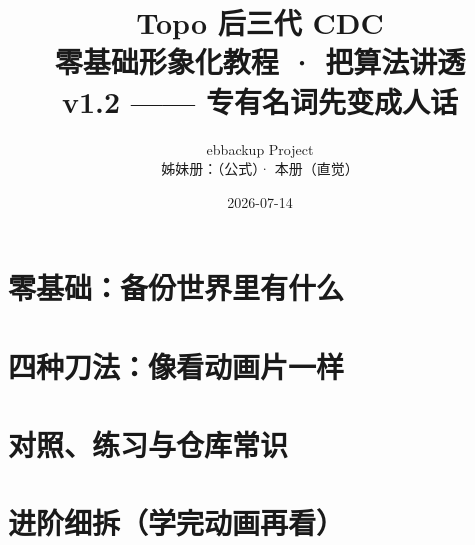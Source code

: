\documentclass[12pt,a4paper,openany]{ctexbook}
\title{Topo 后三代 CDC\\[0.3em]
  \Large 零基础形象化教程 · 把算法讲透\\[0.2em]
  \normalsize v1.2 —— 专有名词先变成人话}
\author{ebbackup Project\\[0.15em]
  {\small 姊妹册：\filepath{topo-gens-manual}（公式）· 本册（直觉）}}
\date{2026-07-14}
\begin{document}
\frontmatter
\maketitle

\tableofcontents
\listoffigures

\mainmatter
\part{零基础：备份世界里有什么}






\part{四种刀法：像看动画片一样}




\part{对照、练习与仓库常识}









\part{进阶细拆（学完动画再看）}










\appendix



\end{document}
